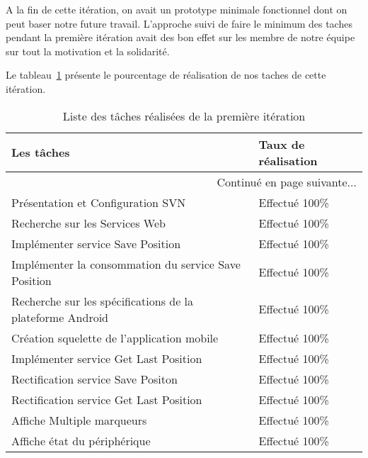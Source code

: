 A la fin de cette itération, on avait un prototype minimale fonctionnel
dont on peut baser notre future travail.
L'approche suivi de faire le minimum des taches pendant la première itération
avait des bon effet sur les membre de notre équipe sur tout la motivation et
la solidarité.

Le tableau~\ref{tab:sprint1-evaluation} présente le pourcentage de
réalisation de nos taches de cette itération.

\begin{center}
    \begin{longtable}{| l | l |}
        \caption{Liste des tâches réalisées de la première itération}
\label{tab:sprint1-evaluation} \\

        \hline
        \textbf{Les tâches} & \textbf{Taux de réalisation} \\ \hline
        \endhead

        \hline \multicolumn{2}{|r|}{{Continué en page suivante$\dotsc$}} \\ \hline
        \endfoot

        \hline \hline
        \endlastfoot

        \hline
Présentation et Configuration SVN & Effectué 100\% \\ \hline
Recherche sur les Services Web & Effectué 100\% \\ \hline
Implémenter service Save Position & Effectué 100\% \\ \hline
Implémenter la consommation du service Save Position & Effectué 100\% \\ \hline
Recherche sur les spécifications de la plateforme Android & Effectué 100\% \\ \hline
Création squelette de l'application mobile & Effectué 100\% \\ \hline
Implémenter service Get Last Position & Effectué 100\% \\ \hline
Rectification service Save Positon & Effectué 100\% \\ \hline
Rectification service Get Last Position & Effectué 100\% \\ \hline
Affiche Multiple marqueurs & Effectué 100\% \\ \hline
Affiche état du périphérique & Effectué 100\% \\ \hline
    \end{longtable}
\end{center}
